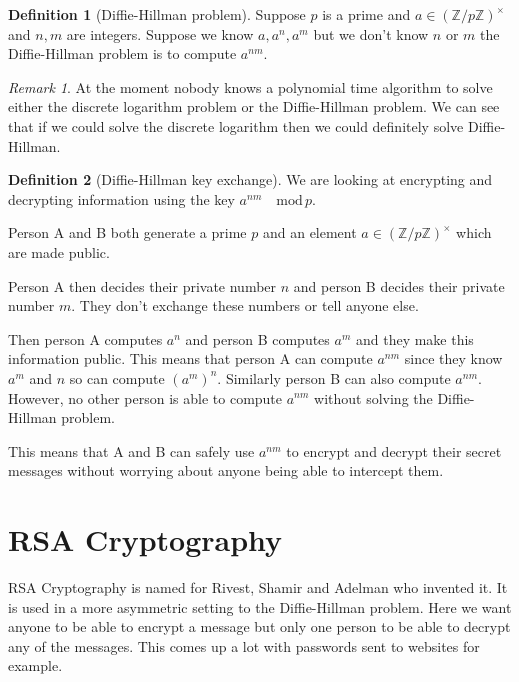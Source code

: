 \documentclass[
]{book}
\theoremstyle{definition}
\newtheorem{definition}{Definition}[chapter]
\theoremstyle{definition}
\theoremstyle{definition}
\theoremstyle{definition}
\theoremstyle{remark}
\newtheorem*{remark}{Remark}
\begin{document}
\begin{definition}[Diffie-Hillman problem]
Suppose \(p\) is a prime and \(a \in \left(\mathbb{Z}/p\mathbb{Z} \right)^{\times}\) and \(n, m\) are integers. Suppose we know \(a, a^n, a^m\) but we don't know \(n\) or \(m\) the Diffie-Hillman problem is to compute \(a^{nm}\).
\end{definition}

\begin{remark}
At the moment nobody knows a polynomial time algorithm to solve either the discrete logarithm problem or the Diffie-Hillman problem. We can see that if we could solve the discrete logarithm then we could definitely solve Diffie-Hillman.
\end{remark}

\begin{definition}[Diffie-Hillman key exchange]
We are looking at encrypting and decrypting information using the key \(a^{nm} \quad \mbox{mod} \, p\).

Person A and B both generate a prime \(p\) and an element \(a \in \left(\mathbb{Z}/p\mathbb{Z} \right)^{\times}\) which are made public.

Person A then decides their private number \(n\) and person B decides their private number \(m\). They don't exchange these numbers or tell anyone else.

Then person A computes \(a^n\) and person B computes \(a^m\) and they make this information public. This means that person A can compute \(a^{nm}\) since they know \(a^m\) and \(n\) so can compute \((a^m)^n\). Similarly person B can also compute \(a^{nm}\). However, no other person is able to compute \(a^{nm}\) without solving the Diffie-Hillman problem.

This means that A and B can safely use \(a^{nm}\) to encrypt and decrypt their secret messages without worrying about anyone being able to intercept them.
\end{definition}

\section{RSA Cryptography}\label{rsa-cryptography}

RSA Cryptography is named for Rivest, Shamir and Adelman who invented it. It is used in a more asymmetric setting to the Diffie-Hillman problem. Here we want anyone to be able to encrypt a message but only one person to be able to decrypt any of the messages. This comes up a lot with passwords sent to websites for example.
\end{document}
